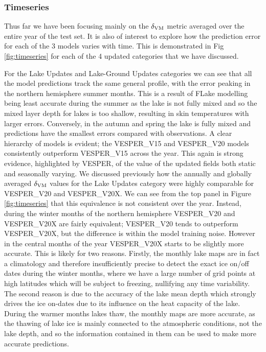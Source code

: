 \documentclass[hess, twostagejnl]{copernicus}
\begin{document}
\subsubsection{Timeseries}
Thus far we have been focusing mainly on the $\delta_{\rm VM}$ metric averaged over the entire year of the test set. It is also of interest to explore how the prediction error for each of the 3 models varies with time. This is demonstrated in Fig \ref{fig:timeseries} for each of the 4 updated categories that we have discussed. \newline 

\noindent For the Lake Updates and Lake-Ground Updates categories we can see that all the model predictions track the same general profile, with the error peaking in the northern hemisphere summer months. This is a result of FLake modelling being least accurate during the summer as the lake is not fully mixed and so the mixed layer depth for lakes is too shallow, resulting in skin temperatures with larger errors. Conversely, in the autumn and spring the lake is fully mixed and predictions have the smallest errors compared with observations. A clear hierarchy of models is evident; the VESPER\_V15 and VESPER\_V20 models consistently outperform VESPER\_V15 across the year. This again is strong evidence, highlighted by VESPER, of the value of the updated fields both static and seasonally varying. We discussed previously how the annually and globally averaged $\delta_{\rm VM}$ values for the Lake Updates category were highly comparable for VESPER\_V20 and VESPER\_V20X. We can see from the top panel in Figure \ref{fig:timeseries} that this equivalence is not consistent over the year. Instead, during the winter months of the northern hemisphere  VESPER\_V20 and VESPER\_V20X are fairly equivalent;  VESPER\_V20 tends to outperform VESPER\_V20X, but the difference is within the model training noise. However in the central months of the year VESPER\_V20X starts to be slightly more accurate. This is likely for two reasons. Firstly, the monthly lake maps are in fact a climatology and therefore insufficiently precise to detect the exact ice on/off dates during the winter months, where we have a large number of grid points at high latitudes which will be subject to freezing, nullifying any time variability. The second reason is due to the accuracy of the lake mean depth which strongly drives the ice on-dates due to its influence on the heat capacity of the lake. During the warmer months lakes thaw, the monthly maps are more accurate, as the thawing of lake ice is mainly connected to the atmospheric conditions, not the lake depth, and so the information contained in them can be used to make more accurate predictions. \newline 
\end{document}
